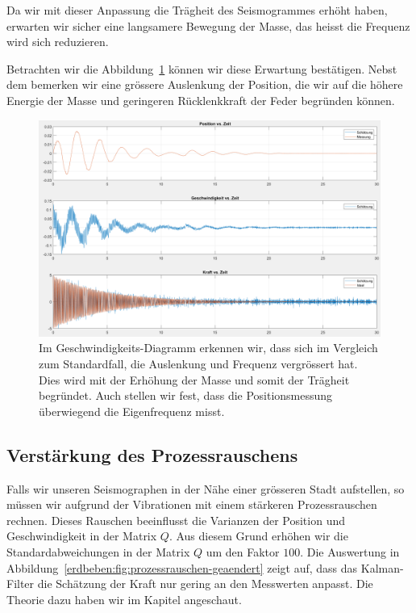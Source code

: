 Da wir mit dieser Anpassung die Trägheit des Seismogrammes erhöht haben, erwarten wir sicher eine langsamere Bewegung der Masse, das heisst die Frequenz wird sich reduzieren.

Betrachten wir die Abbildung~\ref{erdbeben:fig:systemparameter-geaendert} können wir diese Erwartung bestätigen.
Nebst dem bemerken wir eine grössere Auslenkung der Position, die wir auf die höhere Energie der Masse und geringeren Rücklenkkraft der Feder begründen können.

\begin{figure}
	\begin{center}
		\includegraphics[width=\linewidth,keepaspectratio]{papers/erdbeben/Systemparameter_geaendert_2.PNG}
		\caption{Im Geschwindigkeits-Diagramm erkennen wir, dass sich im Vergleich zum Standardfall, die Auslenkung und Frequenz vergrössert hat. Dies wird mit der Erhöhung der Masse und somit der Trägheit begründet. Auch stellen wir fest, dass die Positionsmessung überwiegend die Eigenfrequenz misst.}
    \label{erdbeben:fig:systemparameter-geaendert}
	\end{center}
\end{figure}

\subsection{Verstärkung des Prozessrauschens}
Falls wir unseren Seismographen in der Nähe einer grösseren Stadt aufstellen, so müssen wir aufgrund der Vibrationen mit einem stärkeren Prozessrauschen rechnen.
Dieses Rauschen beeinflusst die Varianzen der Position und Geschwindigkeit in der Matrix $Q$.
Aus diesem Grund erhöhen wir die Standardabweichungen in der Matrix $Q$ um den Faktor $100$.
Die Auswertung in Abbildung~\ref{erdbeben:fig:prozessrauschen-geaendert} zeigt auf, dass das Kalman-Filter die Schätzung der Kraft nur gering an den Messwerten anpasst.
Die Theorie dazu haben wir im Kapitel  angeschaut.

